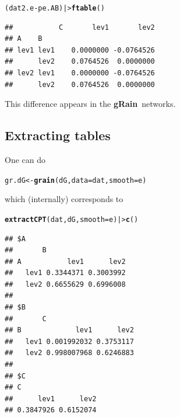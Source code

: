 \documentclass[10pt]{article}\usepackage[]{graphicx}\usepackage[]{xcolor}
\makeatletter
\newcommand{\hlopt}[1]{\textcolor[rgb]{0,0,0}{#1}}%
\newcommand{\hlstd}[1]{\textcolor[rgb]{0.345,0.345,0.345}{#1}}%
\newcommand{\hlkwb}[1]{\textcolor[rgb]{0.69,0.353,0.396}{#1}}%
\newcommand{\hlkwc}[1]{\textcolor[rgb]{0.333,0.667,0.333}{#1}}%
\newcommand{\hlkwd}[1]{\textcolor[rgb]{0.737,0.353,0.396}{\textbf{#1}}}%
\newenvironment{kframe}{%
 \def\at@end@of@kframe{}%
 \ifinner\ifhmode%
  \def\at@end@of@kframe{\end{minipage}}%
  \begin{minipage}{\columnwidth}%
 \fi\fi%
 \def\FrameCommand##1{\hskip\@totalleftmargin \hskip-\fboxsep
 \colorbox{shadecolor}{##1}\hskip-\fboxsep
     \hskip-\linewidth \hskip-\@totalleftmargin \hskip\columnwidth}%
 \MakeFramed {\advance\hsize-\width
   \@totalleftmargin\z@ \linewidth\hsize
   \@setminipage}}%
 {\par\unskip\endMakeFramed%
 \at@end@of@kframe}
\newenvironment{knitrout}{}{} %
\def\grbn{{\bf gRain}}
\makeatother
\begin{document}
\begin{knitrout}
\color{fgcolor}\begin{kframe}
\begin{alltt}
\hlstd{(dat2.e} \hlopt{-} \hlstd{pe.AB)  |>} \hlkwd{ftable}\hlstd{()}
\end{alltt}
\begin{verbatim}
##           C       lev1       lev2
## A    B                           
## lev1 lev1    0.0000000 -0.0764526
##      lev2    0.0764526  0.0000000
## lev2 lev1    0.0000000 -0.0764526
##      lev2    0.0764526  0.0000000
\end{verbatim}
\end{kframe}
\end{knitrout}
This difference appears in the \grbn\ networks.

\subsection{Extracting tables}
\label{sec:extracting-tables}

One can do
\begin{knitrout}
\color{fgcolor}\begin{kframe}
\begin{alltt}
\hlstd{gr.dG} \hlkwb{<-} \hlkwd{grain}\hlstd{(dG,} \hlkwc{data}\hlstd{=dat,} \hlkwc{smooth}\hlstd{=e)}
\end{alltt}
\end{kframe}
\end{knitrout}

which (internally) corresponds to
\begin{knitrout}
\color{fgcolor}\begin{kframe}
\begin{alltt}
\hlkwd{extractCPT}\hlstd{(dat, dG,} \hlkwc{smooth}\hlstd{=e)  |>} \hlkwd{c}\hlstd{()}
\end{alltt}
\begin{verbatim}
## $A
##       B
## A           lev1      lev2
##   lev1 0.3344371 0.3003992
##   lev2 0.6655629 0.6996008
## 
## $B
##       C
## B             lev1      lev2
##   lev1 0.001992032 0.3753117
##   lev2 0.998007968 0.6246883
## 
## $C
## C
##      lev1      lev2 
## 0.3847926 0.6152074
\end{verbatim}
\end{kframe}
\end{knitrout}
\end{document}
